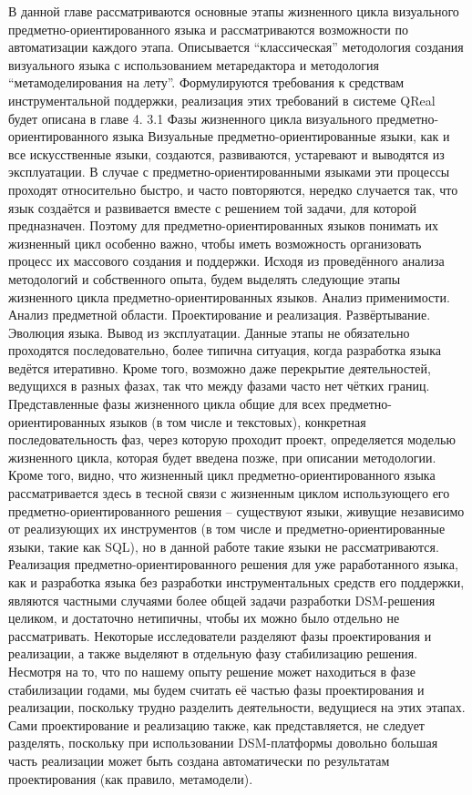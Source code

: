 	В данной главе рассматриваются основные этапы жизненного цикла визуального предметно-ориентированного языка и рассматриваются возможности по автоматизации каждого этапа. Описывается “классическая” методология создания визуального языка с использованием метаредактора и методология “метамоделирования на лету”. Формулируются требования к средствам инструментальной поддержки, реализация этих требований в системе QReal будет описана в главе 4.
3.1 Фазы жизненного цикла визуального предметно-ориентированного языка
	Визуальные предметно-ориентированные языки, как и все искусственные языки, создаются, развиваются, устаревают и выводятся из эксплуатации. В случае с предметно-ориентированными языками эти процессы проходят относительно быстро, и часто повторяются, нередко случается так, что язык создаётся и развивается вместе с решением той задачи, для которой предназначен. Поэтому для предметно-ориентированных языков понимать их жизненный цикл особенно важно, чтобы иметь возможность организовать процесс их массового создания и поддержки. Исходя из проведённого анализа методологий и собственного опыта, будем выделять следующие этапы жизненного цикла предметно-ориентированных языков.
Анализ применимости. 
Анализ предметной области.
Проектирование и реализация.
Развёртывание.
Эволюция языка.
Вывод из эксплуатации.
	Данные этапы не обязательно проходятся последовательно, более типична ситуация, когда разработка языка ведётся итеративно. Кроме того, возможно даже перекрытие деятельностей, ведущихся в разных фазах, так что между фазами часто нет чётких границ. Представленные фазы жизненного цикла общие для всех предметно-ориентированных языков (в том числе и текстовых), конкретная последовательность фаз, через которую проходит проект, определяется моделью жизненного цикла, которая будет введена позже, при описании методологии. Кроме того, видно, что жизненный цикл предметно-ориентированного языка рассматривается здесь в тесной связи с жизненным циклом использующего его предметно-ориентированного решения – существуют языки, живущие независимо от реализующих их инструментов (в том числе и предметно-ориентированные языки, такие как SQL), но в данной работе такие языки не рассматриваются. Реализация предметно-ориентированного решения для уже раработанного языка, как и разработка языка без разработки инструментальных средств его поддержки, являются частными случаями более общей задачи разработки DSM-решения целиком, и достаточно нетипичны, чтобы их можно было отдельно не рассматривать.
	Некоторые исследователи разделяют фазы проектирования и реализации, а также выделяют в отдельную фазу стабилизацию решения. Несмотря на то, что по нашему опыту решение может находиться в фазе стабилизации годами, мы будем считать её частью фазы проектирования и реализации, поскольку трудно разделить деятельности, ведущиеся на этих этапах. Сами проектирование и реализацию также, как представляется, не следует разделять, поскольку при использовании DSM-платформы довольно большая часть реализации может быть создана автоматически по результатам проектирования (как правило, метамодели).
